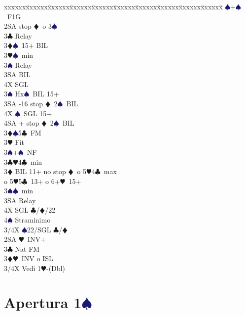 \documentclass[a4paper,italian]{article}
\newcommand{\BC}{\textcolor{OliveGreen}{$\clubsuit$}}
\newcommand{\BD}{\textcolor{RedOrange}{$\vardiamondsuit$}}
\newcommand{\BH}{\textcolor{Red2}{$\varheartsuit${}}}
\newcommand{\BS}{\textcolor{MidnightBlue}{$\spadesuit${}}}
\newcommand{\pdfs}{\texorpdfstring{\BS{}}{S}}
\newenvironment{bidtable}
{\begin{tabbing}

    xxxxxx\=xxxxxx\=xxxxxx\=xxxxxx\=xxxxxx\=xxxxxx\=xxxxxx\=xxxxxx\=xxxxxx\=xxxxxx\=\kill}
{\end{tabbing} }%
\begin{document}
\begin{multicols}{2}
\begin{bidtable}
        \BS {}+\BS\ F1G\+\+\\
        2SA  stop \BD\ o 3\BS \+\\
        3\BC \> Relay\+\\
        3\BD {}\BS\ 15+ BIL\\
        3\BH {}\BS\ min\+\\
        3\BS \> Relay\+\\
        3SA \> BIL\\
        4X \> SGL\-\-\\
        3\BS \> Hx\BS\ BIL 15+\\
        3SA -16 stop \BD\ 2\BS\ BIL\\
        4X \BS\ SGL 15+\\
        4SA + stop \BD\ 2\BS\ BIL\-\\
        3\BD {}\BS 5\BC\ FM\\
        3\BH \> Fit\\
        3\BS {}+\BS\ NF\-\\
        3\BC {}\BH 4\BC\ min\\
        3\BD \> BIL 11+ no stop \BD\ o 5\BH 4\BC\ max\+\\ o 5\BH 5\BC\ 13+ o 6+\BH\ 15+\-\\
        3\BS {}\BS\ min\+\\
        3SA \> Relay\+\\
        4X \> SGL \BC /\BD /22\\
        4\BS \> Straminimo\-\-\\
        3/4X \BS 22/SGL \BC /\BD \-\\
        2SA \BH\ INV+\\
        3\BC\> Nat FM\\
        3\BD{}\BH\ INV o ISL\\
        3/4X \> Vedi 1\BH -(Dbl)\-
    \end{bidtable}

\end{multicols}

\newpage

\section{Apertura 1\pdfs}
\end{document}

